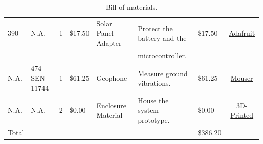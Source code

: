 \documentclass[12pt]{article}
\begin{document}
\begin{table}[H]
{\begin{tabular}{l|l|c|l|l|l|l|c}
    	390 & N.A. & 1 & \$17.50 & Solar Panel Adapter & Protect the battery and the & \$17.50 & \href{https://www.adafruit.com/products/390}{Adafruit} \\
    	& & & & & microcontroller. & & \\
		N.A. & 474-SEN-11744 & 1 & \$61.25 & Geophone & Measure ground vibrations. & \$61.25 & \href{http://www.mouser.com/ProductDetail/SparkFun-Electronics/SEN-11744/?qs=\%2fha2pyFaduhLW6YoPw5UUIdTRP1X\%252btPruyfOHvl8\%2fY0\%3d}{Mouser} \\
    	N.A. & N.A. & 2 & \$0.00 & Enclosure Material & House the system prototype. & \$0.00 & \href{}{3D-Printed} \\ \hline
    	Total & & & & & & \$386.20
	\end{tabular}%
	}
    \caption{Bill of materials.}
    \label{tab:bom}
\end{table}
\end{document}

